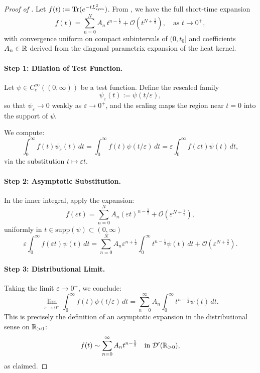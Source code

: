 \begin{proof}[Proof of ]
Let \( f(t) := \operatorname{Tr}(e^{-t L_{\mathrm{sym}}^2}) \). From , we have the full short-time expansion
\[
f(t) = \sum_{n=0}^N A_n \, t^{n - \frac{1}{2}} + \mathcal{O}(t^{N + \frac{1}{2}}), \quad \text{as } t \to 0^+,
\]
with convergence uniform on compact subintervals of \( (0, t_0] \) and coefficients \( A_n \in \mathbb{R} \) derived from the diagonal parametrix expansion of the heat kernel.

\paragraph{Step 1: Dilation of Test Function.}
Let \( \psi \in C_c^\infty((0, \infty)) \) be a test function. Define the rescaled family
\[
\psi_\varepsilon(t) := \psi(t/\varepsilon),
\]
so that \( \psi_\varepsilon \to 0 \) weakly as \( \varepsilon \to 0^+ \), and the scaling maps the region near \( t = 0 \) into the support of \( \psi \).

We compute:
\[
\int_0^\infty f(t) \psi_\varepsilon(t)\, dt
= \int_0^\infty f(t) \psi(t/\varepsilon)\, dt
= \varepsilon \int_0^\infty f(\varepsilon t) \psi(t)\, dt,
\]
via the substitution \( t \mapsto \varepsilon t \).

\paragraph{Step 2: Asymptotic Substitution.}
In the inner integral, apply the expansion:
\[
f(\varepsilon t) = \sum_{n=0}^N A_n (\varepsilon t)^{n - \frac{1}{2}} + \mathcal{O}(\varepsilon^{N + \frac{1}{2}}),
\]
uniformly in \( t \in \text{supp}(\psi) \subset (0, \infty) \)
\[
\varepsilon \int_0^\infty f(\varepsilon t) \psi(t)\, dt
= \sum_{n=0}^N A_n \varepsilon^{n + \frac{1}{2}} \int_0^\infty t^{n - \frac{1}{2}} \psi(t)\, dt + \mathcal{O}(\varepsilon^{N + \frac{3}{2}}).
\]

\paragraph{Step 3: Distributional Limit.}
Taking the limit \( \varepsilon \to 0^+ \), we conclude:
\[
\lim_{\varepsilon \to 0^+} \int_0^\infty f(t) \psi(t/\varepsilon)\, dt
= \sum_{n=0}^\infty A_n \int_0^\infty t^{n - \frac{1}{2}} \psi(t)\, dt.
\]
This is precisely the definition of an asymptotic expansion in the distributional sense on \( \mathbb{R}_{>0} \):
\[
f(t) \sim \sum_{n=0}^\infty A_n t^{n - \frac{1}{2}} \quad \text{in } \mathcal{D}'(\mathbb{R}_{>0}),
\]
as claimed.
\end{proof}
